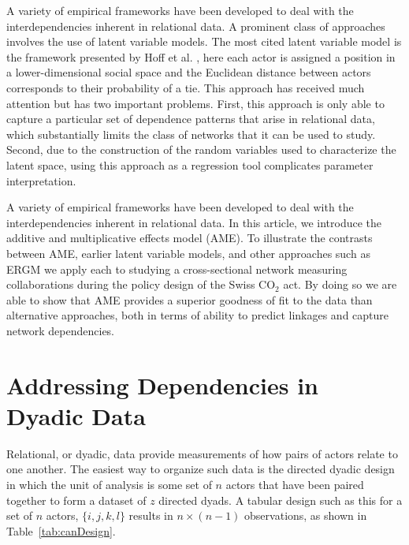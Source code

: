 \documentclass[9pt,twocolumn,twoside,lineno]{pnas-new}
\begin{document}

A variety of empirical frameworks have been developed to deal with the interdependencies inherent in relational data. A prominent class of approaches involves the use of latent variable models. The most cited latent variable model is the framework presented by Hoff et al. \cite{hoff:etal:2002}, here each actor is assigned a position in a lower-dimensional social space and the Euclidean distance between actors corresponds to their probability of a tie. This approach has received much attention but has two important problems. First, this approach is only able to capture a particular set of dependence patterns that arise in relational data, which substantially limits the class of networks that it can be used to study. Second, due to the construction of the random variables used to characterize the latent space, using this approach as a regression tool complicates parameter interpretation.

A variety of empirical frameworks have been developed to deal with the interdependencies inherent in relational data. In this article, we introduce the additive and multiplicative effects model (AME). To illustrate the contrasts between AME, earlier latent variable models, and other approaches such as ERGM we apply each to studying a cross-sectional network measuring collaborations during the policy design of the Swiss CO$_{2}$ act. By doing so we are able to show that AME provides a superior goodness of fit to the data than alternative approaches, both in terms of ability to predict linkages and capture network dependencies. 

\section*{\textbf{Addressing Dependencies in Dyadic Data}}

Relational, or dyadic, data provide measurements of how pairs of actors relate to one another. The easiest way to organize such data is the directed dyadic design in which the unit of analysis is some set of $n$ actors that have been paired together to form a dataset of $z$ directed dyads. A tabular design such as this for a set of $n$ actors, $\{i, j, k, l \}$ results in $n \times (n-1)$ observations, as shown in Table~\ref{tab:canDesign}. 
\end{document}
